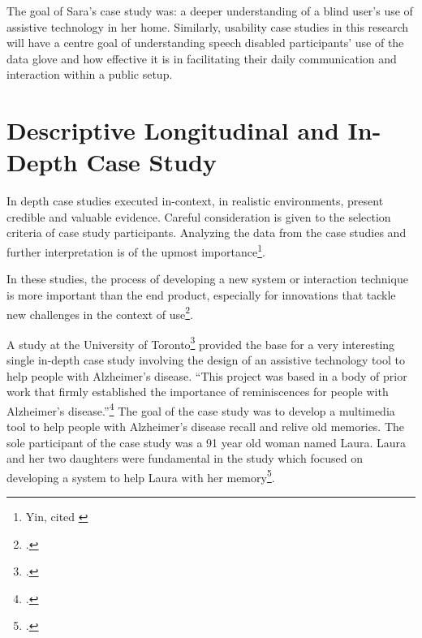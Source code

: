 The goal of Sara’s case study was: a deeper understanding of a blind user’s use of assistive technology in her home.  Similarly, usability case studies in this research will have a centre goal of understanding speech disabled participants’ use of the data glove and how effective it is in facilitating their daily communication and interaction within a public setup. 

\section{Descriptive Longitudinal and In-Depth Case Study}

In depth case studies executed in-context, in realistic environments, present credible and valuable evidence.  Careful consideration is given to the selection criteria of case study participants. Analyzing the data from the case studies and further interpretation is of the upmost importance\footnote{Yin, cited \cite{Lazar2010}}.

In these studies, the process of developing a new system or interaction technique is more important than the end product, especially for innovations that tackle new challenges in the context of use\footcite{Cohene2007}. 

A study at the University of Toronto\footcite{Cohene2007} provided the base for a very interesting single in-depth case study involving the design of an assistive technology tool to help people with Alzheimer’s disease. ``This project was based in a body of prior work that firmly established the importance of reminiscences for people with Alzheimer’s disease.''\footcite{Cohene2007} The goal of the case study was to develop a multimedia tool to help people with Alzheimer’s disease recall and relive old memories. The sole participant of the case study was a 91 year old woman named Laura. Laura and her two daughters were fundamental in the study which focused on developing a system to help Laura with her memory\footcite{Cohene2007}. 


